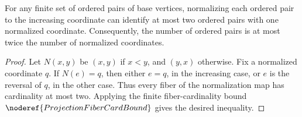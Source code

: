 \begin{helper}
For any finite set of ordered pairs of base vertices, normalizing each ordered
pair to the increasing coordinate can identify at most two ordered pairs with
one normalized coordinate.  Consequently, the number of ordered pairs is at
most twice the number of normalized coordinates.
\end{helper}
\begin{proof}
Let \(N(x,y)\) be \((x,y)\) if \(x<y\), and \((y,x)\) otherwise.  Fix a
normalized coordinate \(q\).  If \(N(e)=q\), then either \(e=q\), in the
increasing case, or \(e\) is the reversal of \(q\), in the other case.  Thus
every fiber of the normalization map has cardinality at most two.  Applying
the finite fiber-cardinality bound \(\noderef{ProjectionFiberCardBound}\) gives
the desired inequality.
\end{proof}
